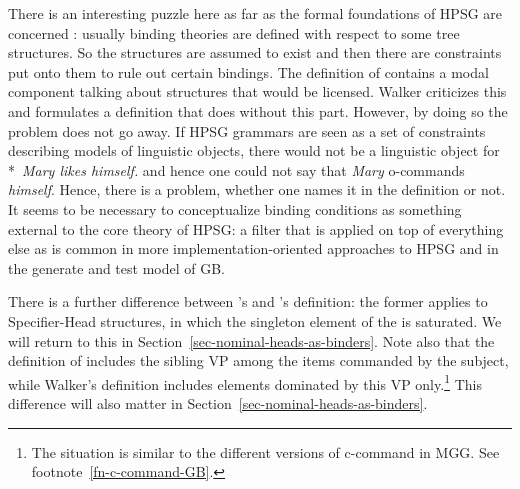 \documentclass[output=paper
	        ,collection
	        ,collectionchapter
 	        ,biblatex
                ,babelshorthands
                ,newtxmath
                ,draftmode
                ,colorlinks, citecolor=brown
]{langscibook}
\begin{document}
There is an interesting puzzle here as far as the formal foundations of HPSG are concerned
: usually binding theories are defined with respect to some tree
structures. So the structures are assumed to exist and then there are constraints put onto them to
rule out certain bindings. The definition of \citeauthor{HL95b} contains a modal component talking
about structures that would be licensed. Walker criticizes this and formulates a definition that
does without this part. However, by doing so the problem does not go away. If HPSG grammars are seen
as a set of constraints describing models of linguistic objects, there would not be a linguistic
object for *~\emph{Mary likes himself.} and hence one could not say that \emph{Mary} o-commands
\emph{himself}. Hence, there is a problem, whether one names it in the definition or not. It seems
to be necessary to conceptualize binding conditions as something external to the core theory of
HPSG: a filter that is applied on top of everything else as is common in more
implementation-oriented approaches to HPSG and in the generate and test model of GB.


There is a further difference between \citeauthor{HL95b}'s and \citeauthor{Walker2011a}'s
definition: the former applies to Specifier-Head structures, in which the singleton element of the
\sprl is saturated. We will return to this in Section~\ref{sec-nominal-heads-as-binders}. Note also
that the definition of \citeauthor{HL95b} includes the sibling VP among the items commanded by the
subject, while Walker's definition includes elements dominated by this VP only.\footnote{%
  The situation is similar to the different versions of c-command in MGG. See footnote~\ref{fn-c-command-GB}.
}
This difference will also matter in Section~\ref{sec-nominal-heads-as-binders}.
\end{document}
